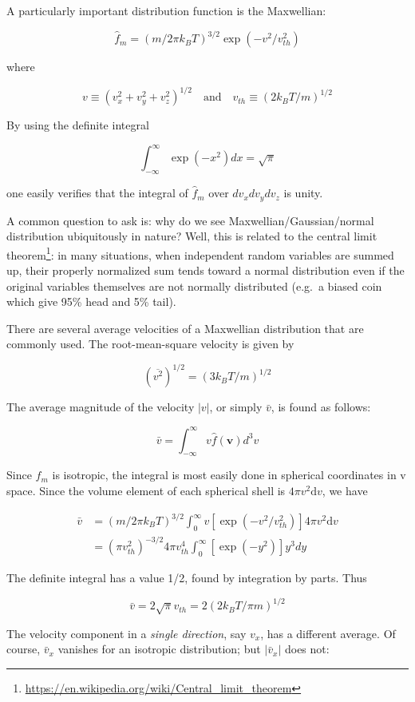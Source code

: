 \documentclass[
  notoc %
]{tufte-book}
\DeclareRobustCommand{\href}[2]{#2\footnote{\url{#1}}}
\begin{document}
A particularly important distribution function is the Maxwellian:

\[
\hat{f}_m = (m/2\pi k_B T)^{3/2}\exp(-v^2/v_{th}^2)
\]

where

\[
v\equiv(v_x^2 + v_y^2 + v_z^2)^{1/2}\quad\text{and}\quad v_{th}\equiv(2k_B T/m)^{1/2}
\]

By using the definite integral

\[
\int_{-\infty}^{\infty}\exp(-x^2)dx = \sqrt{\pi}
\]

one easily verifies that the integral of \(\hat{f}_m\) over
\(dv_x dv_y dv_z\) is unity.

A common question to ask is: why do we see Maxwellian/Gaussian/normal
distribution ubiquitously in nature? Well, this is related to the
\href{https://en.wikipedia.org/wiki/Central_limit_theorem}{central limit
theorem}: in many situations, when independent random variables are
summed up, their properly normalized sum tends toward a normal
distribution even if the original variables themselves are not normally
distributed (e.g.~a biased coin which give 95\% head and 5\% tail).

There are several average velocities of a Maxwellian distribution that
are commonly used. The root-mean-square velocity is given by

\[
(\overline{v^2})^{1/2} = (3k_B T/m)^{1/2}
\]

The average magnitude of the velocity \(|v|\), or simply \(\bar{v}\), is
found as follows:

\[
\bar{v} = \int_{-\infty}^{\infty}v\hat{f}(\mathbf{v})d^3v
\]

Since \(\hat{f}_m\) is isotropic, the integral is most easily done in
spherical coordinates in v space. Since the volume element of each
spherical shell is \(4\pi v^2 \mathrm{d}v\), we have

\[
\begin{aligned}
\bar{v} &= (m/2\pi k_B T)^{3/2}\int_0^\infty v[\exp(-v^2/v_{th}^2)]4\pi v^2 \mathrm{d}v \\
&= (\pi v_{th}^2)^{-3/2} 4\pi v_{th}^4 \int_0^\infty [\exp(-y^2)]y^3 dy
\end{aligned}
\]

The definite integral has a value 1/2, found by integration by parts.
Thus

\[
\bar{v} = 2\sqrt{\pi}v_{th} = 2(2k_B T/\pi m)^{1/2}
\]

The velocity component in a \emph{single direction}, say \(v_x\), has a
different average. Of course, \(\bar{v}_x\) vanishes for an isotropic
distribution; but \(|\bar{v}_x|\) does not:
\end{document}

